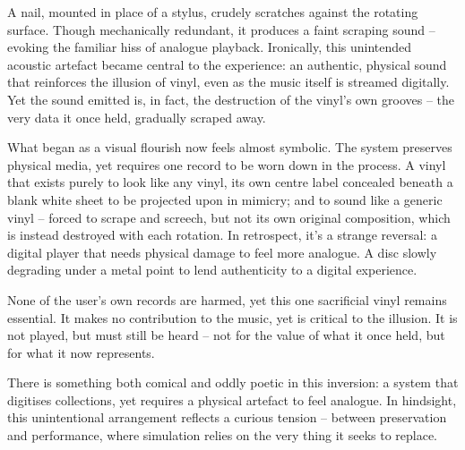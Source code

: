 \begin{uomappendix}
        A nail, mounted in place of a stylus, crudely scratches against the rotating surface. Though mechanically redundant, it produces a faint scraping sound -- evoking the familiar hiss of analogue playback. Ironically, this unintended acoustic artefact became central to the experience: an authentic, physical sound that reinforces the illusion of vinyl, even as the music itself is streamed digitally. Yet the sound emitted is, in fact, the destruction of the vinyl's own grooves -- the very data it once held, gradually scraped away.
        
        What began as a visual flourish now feels almost symbolic. The system preserves physical media, yet requires one record to be worn down in the process. A vinyl that exists purely to look like any vinyl, its own centre label concealed beneath a blank white sheet to be projected upon in mimicry; and to sound like a generic vinyl -- forced to scrape and screech, but not its own original composition, which is instead destroyed with each rotation. In retrospect, it's a strange reversal: a digital player that needs physical damage to feel more analogue. A disc slowly degrading under a metal point to lend authenticity to a digital experience.
        
        None of the user's own records are harmed, yet this one sacrificial vinyl remains essential. It makes no contribution to the music, yet is critical to the illusion. It is not played, but must still be heard -- not for the value of what it once held, but for what it now represents.
        
        There is something both comical and oddly poetic in this inversion: a system that digitises collections, yet requires a physical artefact to feel analogue. In hindsight, this unintentional arrangement reflects a curious tension -- between preservation and performance, where simulation relies on the very thing it seeks to replace.
        
    \end{uomappendix}
    
    
    